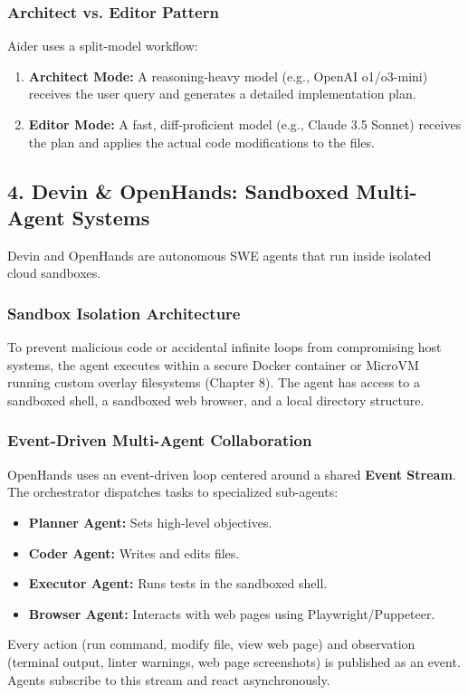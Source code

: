 \subsubsection{Architect vs. Editor Pattern}
Aider uses a split-model workflow:
\begin{enumerate}
    \item \textbf{Architect Mode:} A reasoning-heavy model (e.g., OpenAI o1/o3-mini) receives the user query and generates a detailed implementation plan.
    \item \textbf{Editor Mode:} A fast, diff-proficient model (e.g., Claude 3.5 Sonnet) receives the plan and applies the actual code modifications to the files.
\end{enumerate}

\subsection{4. Devin \& OpenHands: Sandboxed Multi-Agent Systems}

Devin and OpenHands are autonomous SWE agents that run inside isolated cloud sandboxes.

\subsubsection{Sandbox Isolation Architecture}
To prevent malicious code or accidental infinite loops from compromising host systems, the agent executes within a secure Docker container or MicroVM running custom overlay filesystems (Chapter 8). The agent has access to a sandboxed shell, a sandboxed web browser, and a local directory structure.

\subsubsection{Event-Driven Multi-Agent Collaboration}
OpenHands uses an event-driven loop centered around a shared \textbf{Event Stream}. The orchestrator dispatches tasks to specialized sub-agents:
\begin{itemize}
    \item \textbf{Planner Agent:} Sets high-level objectives.
    \item \textbf{Coder Agent:} Writes and edits files.
    \item \textbf{Executor Agent:} Runs tests in the sandboxed shell.
    \item \textbf{Browser Agent:} Interacts with web pages using Playwright/Puppeteer.
\end{itemize}
Every action (run command, modify file, view web page) and observation (terminal output, linter warnings, web page screenshots) is published as an event. Agents subscribe to this stream and react asynchronously.

